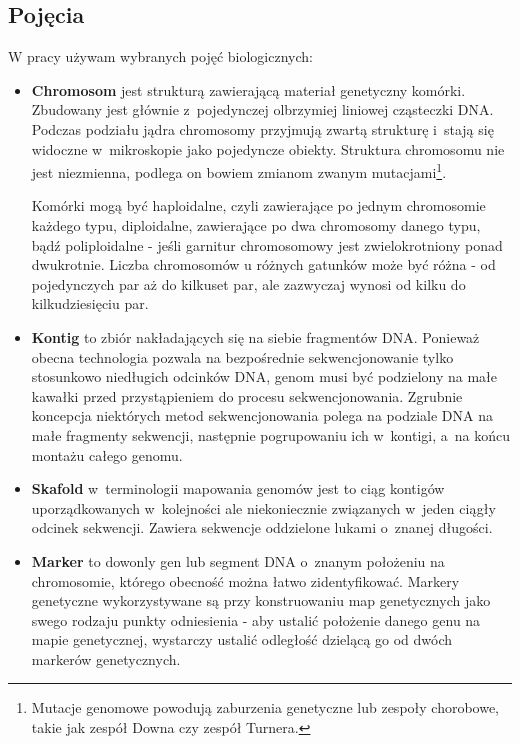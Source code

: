 \documentclass[a4paper,12pt,oneside]{mwrep}  %
\begin{document}
\subsection{Pojęcia}
W pracy używam wybranych pojęć biologicznych:
\begin{itemize}
\item \textbf{Chromosom} jest strukturą zawierającą materiał genetyczny komórki. Zbudowany jest głównie z~pojedynczej olbrzymiej liniowej cząsteczki DNA. Podczas podziału jądra chromosomy przyjmują zwartą strukturę i~stają się widoczne w~mikroskopie jako pojedyncze obiekty. Struktura chromosomu nie jest niezmienna, podlega on bowiem zmianom zwanym mutacjami\footnote{Mutacje genomowe powodują zaburzenia genetyczne lub zespoły chorobowe, takie jak zespół Downa czy zespół Turnera.}. \cite{wikipedia-pl, pwn-encyklopedia} %

Komórki mogą być haploidalne, czyli zawierające po jednym chromosomie każdego typu, diploidalne, zawierające po dwa chromosomy danego typu, bądź poliploidalne - jeśli garnitur chromosomowy jest zwielokrotniony ponad dwukrotnie. Liczba chromosomów u różnych gatunków może być różna - od pojedynczych par aż do kilkuset par, ale zazwyczaj wynosi od kilku do kilkudziesięciu par.\cite{wikipedia-pl, pwn-encyklopedia} %

\item \textbf{Kontig} to zbiór nakładających się na siebie fragmentów DNA. Ponieważ obecna technologia pozwala na bezpośrednie sekwencjonowanie tylko stosunkowo niedługich odcinków DNA, genom musi być podzielony na małe kawałki przed przystąpieniem do procesu sekwencjonowania. Zgrubnie koncepcja niektórych metod sekwencjonowania polega na podziale DNA na małe fragmenty sekwencji, następnie pogrupowaniu ich w~kontigi, a~na końcu montażu całego genomu.\cite{wikipedia-en} %

\item \textbf{Skafold} w~terminologii mapowania genomów jest to ciąg kontigów uporządkowanych w~kolejności ale niekoniecznie związanych w~jeden ciągły odcinek sekwencji. Zawiera sekwencje oddzielone lukami o~znanej długości. \cite{medicinenet}

\item \textbf{Marker} to dowonly gen lub segment DNA o~znanym położeniu na chromosomie, którego obecność można łatwo zidentyfikować. Markery genetyczne  wykorzystywane są przy konstruowaniu map genetycznych jako swego rodzaju punkty odniesienia - aby ustalić położenie danego genu na mapie genetycznej, wystarczy ustalić odległość dzielącą go od dwóch markerów genetycznych.\cite{pwn-encyklopedia} %
\end{itemize}
\end{document}
